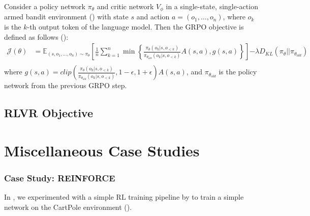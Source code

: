 \documentclass{article} %
\theoremstyle{definition}
\begin{document}
Consider a policy network $\pi_\theta$ and critic network $V_\phi$ in a single-state,
single-action armed bandit environment (\cite{Sutton-and-Barto-1998, contextualbandit}) 
with state $s$ and action $a = (o_1, \dots, o_n)$,
where $o_k$ is the $k$-th output token of the language model.
Then the GRPO objective is defined as follows (\cite{grpo, wk10}):
\begin{equation}
    \label{eq:grpo-obj}
    \begin{array}{rl}
        \mathcal{J}(\theta) &= \mathbb{E}_{(s, o_1, \dots, o_n) \sim \pi_\theta} \left[ 
            \displaystyle
            \frac{1}{n} \sum_{k = 1}^n \min \left\{
                \frac{\pi_\theta(o_k|s, o_{< k})}{\pi_{\theta_{old}}(o_k|s, o_{< k})} A(s, a),
                g(s, a)
            \right\}
        \right] {\displaystyle - \lambda D_{KL}(\pi_\theta || \pi_{\theta_{old}})} \\
    \end{array}
\end{equation}
where ${\displaystyle g(s, a) = clip\left(\frac{\pi_\theta(o_k|s, o_{< k})}{\pi_{\theta_{old}}(o_k|s, o_{< k})}, 1 - \epsilon, 1 + \epsilon \right) A(s, a)}$,
and $\pi_{\theta_{old}}$ is the policy network from the previous GRPO step.


\subsection{RLVR Objective}

\section{Miscellaneous Case Studies}

\subsubsection{Case Study: REINFORCE} \label{sec:cs-reinforce}
In \cite{wk3}, we experimented with a simple RL training pipeline by 
\cite{Levine-et-al-2023} to train a simple network on the CartPole environment (\cite{Towers-et-al-2024}).
 
\end{document}
